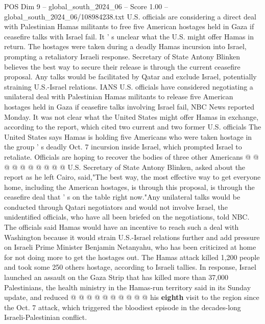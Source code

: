 \begin{textsample}{POS Dim 9 – global\_south\_2024\_06 – Score 1.00 – global\_south\_2024\_06/108984238.txt}  \label{ex:f9_pos_054}
U.S. officials are considering a direct deal with Palestinian Hamas militants to free five American hostages held in Gaza if ceasefire talks with Israel fail.
It ' s unclear what the U.S. might offer Hamas in return.
The hostages were taken during a deadly Hamas incursion into Israel, prompting a retaliatory Israeli response.
Secretary of State Antony Blinken believes the best way to secure their release is through the current ceasefire proposal.
Any talks would be facilitated by Qatar and exclude Israel, potentially straining U.S.-Israel relations.
IANS U.S. officials have considered negotiating a unilateral deal with Palestinian Hamas militants to release five American hostages held in Gaza if ceasefire talks involving Israel fail, NBC News reported Monday.
It was not clear what the United States might offer Hamas in exchange, according to the report, which cited two current and two former U.S. officials The United States says Hamas is holding five Americans who were taken hostage in the group ' s deadly Oct. 7 incursion inside Israel, which prompted Israel to retaliate.
Officials are hoping to recover the bodies of three other Americans @ @ @ @ @ @ @ @ @ @ U.S.
Secretary of State Antony Blinken, asked about the report as he left Cairo, said,"The best way, the most effective way to get everyone home, including the American hostages, is through this proposal, is through the ceasefire deal that ' s on the table right now."Any unilateral talks would be conducted through Qatari negotiators and would not involve Israel, the unidentified officials, who have all been briefed on the negotiations, told NBC.
The officials said Hamas would have an incentive to reach such a deal with Washington because it would strain U.S.-Israel relations further and add pressure on Israeli Prime Minister Benjamin Netanyahu, who has been criticized at home for not doing more to get the hostages out.
The Hamas attack killed 1,200 people and took some 250 others hostage, according to Israeli tallies.
In response, Israel launched an assault on the Gaza Strip that has killed more than 37,000 Palestinians, the health ministry in the Hamas-run territory said in its Sunday update, and reduced @ @ @ @ @ @ @ @ @ @ his \textbf{eighth} visit to the region since the Oct. 7 attack, which triggered the bloodiest episode in the decades-long Israeli-Palestinian conflict.

\end{textsample}
